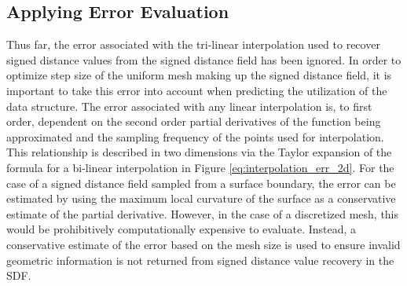 
\subsection{Applying Error Evaluation}

Thus far, the error associated with the tri-linear interpolation used to recover
signed distance values from the signed distance field has been ignored. In order
to optimize step size of the uniform mesh making up the signed distance field,
it is important to take this error into account when predicting the utilization
of the data structure. The error associated with any linear interpolation is, to
first order, dependent on the second order partial derivatives of the function
being approximated and the sampling frequency of the points used for
interpolation. This relationship is described in two dimensions via the Taylor
expansion of the formula for a bi-linear interpolation in Figure
\ref{eq:interpolation_err_2d}. For the case of a signed distance field sampled
from a surface boundary, the error can be estimated by using the maximum local
curvature of the surface as a conservative estimate of the partial
derivative. However, in the case of a discretized mesh, this would be
prohibitively computationally expensive to evaluate. Instead, a conservative
estimate of the error based on the mesh size is used to ensure invalid geometric
information is not returned from signed distance value recovery in the SDF.


